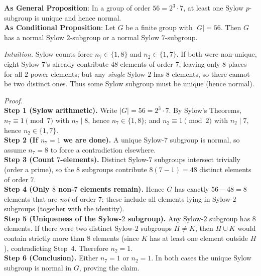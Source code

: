\documentclass[11pt]{article}
\theoremstyle{definition}
\begin{document}
\noindent\textbf{As General Proposition}: In a group of order $56=2^3\cdot 7$, at least one Sylow $p$-subgroup is unique and hence normal.\\

\noindent \textbf{As Conditional Proposition}: Let $G$ be a finite group with $|G|=56$. Then $G$ has a normal Sylow $2$-subgroup or a normal Sylow $7$-subgroup.

\newpage

\dotfill

\emph{Intuition.} Sylow counts force $n_7\in\{1,8\}$ and $n_2\in\{1,7\}$. If both were non-unique, eight Sylow-$7$’s already contribute $48$ elements of order $7$, leaving only $8$ places for all $2$-power elements; but any \emph{single} Sylow-$2$ has $8$ elements, so there cannot be two distinct ones. Thus some Sylow subgroup must be unique (hence normal).\\

\dotfill

\emph{Proof.}\\
\textbf{Step 1 (Sylow arithmetic).} Write $|G|=56=2^3\cdot 7$. By Sylow’s Theorems, $n_7\equiv 1\pmod 7$ with $n_7\mid 8$, hence $n_7\in\{1,8\}$; and $n_2\equiv 1\pmod 2$ with $n_2\mid 7$, hence $n_2\in\{1,7\}$.\\
\textbf{Step 2 (If $n_7=1$ we are done).} A unique Sylow-$7$ subgroup is normal, so assume $n_7=8$ to force a contradiction elsewhere.\\
\textbf{Step 3 (Count $7$-elements).} Distinct Sylow-$7$ subgroups intersect trivially (order a prime), so the $8$ subgroups contribute $8(7-1)=48$ distinct elements of order $7$.\\
\textbf{Step 4 (Only $8$ non-$7$ elements remain).} Hence $G$ has exactly $56-48=8$ elements that are \emph{not} of order $7$; these include all elements lying in Sylow-$2$ subgroups (together with the identity).\\
\textbf{Step 5 (Uniqueness of the Sylow-$2$ subgroup).} Any Sylow-$2$ subgroup has $8$ elements. If there were two distinct Sylow-$2$ subgroups $H\neq K$, then $H\cup K$ would contain strictly more than $8$ elements (since $K$ has at least one element outside $H$), contradicting Step~4. Therefore $n_2=1$.\\
\textbf{Step 6 (Conclusion).} Either $n_7=1$ or $n_2=1$. In both cases the unique Sylow subgroup is normal in $G$, proving the claim.\\

\newpage

\newpage
\end{document}
